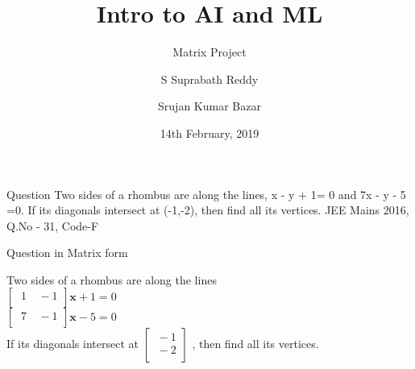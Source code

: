 \documentclass{beamer}
\title{Intro to AI and ML}
\subtitle{Matrix Project}
\author{S Suprabath Reddy \and Srujan Kumar Bazar}
\date{14th February, 2019}
\begin{document}
\begin{frame}
  \titlepage
\end{frame}


\begin{frame}{Question}
Two sides of a rhombus are along the lines, x - y + 1= 0 and 7x - y - 5 =0. If its diagonals intersect at (-1,-2), then find all its vertices.
  \newline
  \newline
JEE Mains 2016, Q.No - 31, Code-F
\end{frame}

\begin{frame}{Question in Matrix form}

Two sides of a rhombus are along the lines
\\
$ \begin{bmatrix}
  \ 1 &
  \ -1 \\
\end{bmatrix}
\textbf{x} + 1 = 0 $ 
\\ 
$  \begin{bmatrix}
  \ 7 &  
  \ -1 \\
\end{bmatrix} \textbf{x} - 5 = 0 $
\\
If its diagonals intersect at
$ 
\begin{bmatrix}
  \ -1 \\
  \ -2 \\
\end{bmatrix}
$
, then find all its vertices.\\
\end{frame}
\end{document}
